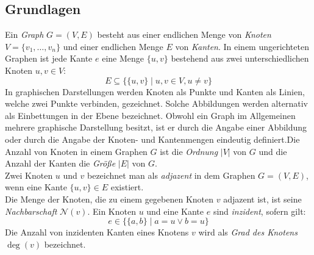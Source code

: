 \subsection{Grundlagen}
Ein \emph{Graph} $G = (V, E)$ besteht aus einer endlichen Menge von \emph{Knoten} $V = \{v_1 ,\ldots, v_n\}$ und einer endlichen Menge $E$ von \emph{Kanten}. In einem ungerichteten Graphen ist jede Kante $e$ eine Menge $\{u, v\}$ bestehend aus zwei unterschiedlichen Knoten $u, v \in V$:
$$E \subseteq \{\{u, v\}\; |\; u, v \in V, u \neq v\}$$
In graphischen Darstellungen werden Knoten als Punkte und Kanten als Linien, welche zwei Punkte verbinden, gezeichnet. Solche Abbildungen werden alternativ als Einbettungen in der Ebene bezeichnet. Obwohl ein Graph im Allgemeinen mehrere graphische Darstellung besitzt, ist er durch die Angabe einer Abbildung oder durch die Angabe der Knoten- und Kantenmengen eindeutig definiert.\newline \newline Die Anzahl von Knoten in einem Graphen $G$ ist die \emph{Ordnung} $|V|$ von $G$ und die Anzahl der Kanten die \emph{Größe} $|E|$ von $G$.\\Zwei Knoten $u$ und $v$ bezeichnet man als \emph{adjazent} in dem Graphen $G=(V,E)$, wenn eine Kante $\{u, v\} \in E$ existiert.\\Die Menge der Knoten, die zu einem gegebenen Knoten $v$ adjazent ist, ist seine \emph{Nachbarschaft} $\mathcal{N}(v)$. Ein Knoten $u$ und eine Kante $e$ sind \emph{inzident}, sofern gilt: $$e \in \{\{a,b\}\;|\;a=u \vee b=u\}$$ Die Anzahl von inzidenten Kanten eines Knotens $v$ wird als \emph{Grad des Knotens} $\deg(v)$ bezeichnet.
